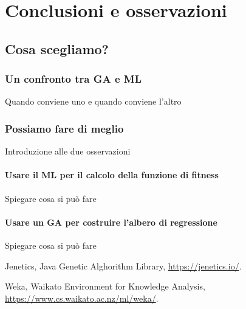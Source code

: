 \documentclass[a4paper, 11pt, oneside]{report}
\begin{document}
    \part{Conclusioni e osservazioni}
        \chapter{Cosa scegliamo?}
            \section{Un confronto tra GA e ML}
                Quando conviene uno e quando conviene l'altro
            \section{Possiamo fare di meglio}
                Introduzione alle due osservazioni
                \subsection{Usare il ML per il calcolo della funzione di fitness}
                Spiegare cosa si può fare
                \subsection{Usare un GA per costruire l'albero di regressione}
                Spiegare cosa si può fare


    \begin{thebibliography}{9} %
        Jenetics, Java Genetic Alghorithm Library,
        \url{https://jenetics.io/}.

        Weka, Waikato Environment for Knowledge Analysis,
        \url{https://www.cs.waikato.ac.nz/ml/weka/}.
    \end{thebibliography}
\end{document}
